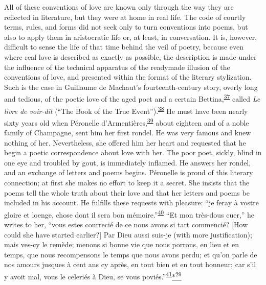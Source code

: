 All of these conventions of love are known only through the way they are
reflected in literature, but they were at home in real life. The code of
courtly terms, rules, and forms did not seek only to turn conventions
into poems, but also to apply them in aristocratic life or, at least, in
conversation. It is, however, difficult to sense the life of that time
behind the veil of poetry, because even where real love is described as
exactly as possible, the description is made under the influence of the
technical apparatus of the readymade illusion of the conventions of
love, and presented within the format of the literary stylization. Such
is the case in Guillaume de Machaut's fourteenth-century story, overly
long and tedious, of the poetic love of the aged poet and a certain
Bettina,\textsuperscript{\protect\hypertarget{11_Chapter_Four__THE_FORMS_OF_LOVE.xhtmlux5cux23id_1415}{\protect\hyperlink{23_NOTES.xhtmlux5cux23id_1416}{37}}}
called \emph{Le livre de voir-dit} (``The Book of the True
Event'').\textsuperscript{\protect\hypertarget{11_Chapter_Four__THE_FORMS_OF_LOVE.xhtmlux5cux23id_1413}{\protect\hyperlink{23_NOTES.xhtmlux5cux23id_1414}{38}}}
He must have been nearly sixty years old when Péronelle
d'Armentières,\textsuperscript{\protect\hypertarget{11_Chapter_Four__THE_FORMS_OF_LOVE.xhtmlux5cux23id_1411}{\protect\hyperlink{23_NOTES.xhtmlux5cux23id_1412}{39}}}
about eighteen and of a noble family of Champagne, sent him her first
\protect\hypertarget{11_Chapter_Four__THE_FORMS_OF_LOVE.xhtmlux5cux23page_145}{}{}rondel.
He was very famous and knew nothing of her. Nevertheless, she offered
him her heart and requested that he begin a poetic correspondence about
love with her. The poor poet, sickly, blind in one eye and troubled by
gout, is immediately inflamed. He answers her rondel, and an exchange of
letters and poems begins. Péronelle is proud of this literary
connection; at first she makes no effort to keep it a secret. She
insists that the poems tell the whole truth about their love and that
her letters and poems be included in his account. He fulfills these
requests with pleasure: ``je feray à vostre gloire et loenge, chose dont
il sera bon
mémoire.''\textsuperscript{\protect\hypertarget{11_Chapter_Four__THE_FORMS_OF_LOVE.xhtmlux5cux23id_1409}{\protect\hyperlink{23_NOTES.xhtmlux5cux23id_1410}{40}}}
``Et mon très-dous cuer,'' he writes to her, ``vous estes courrecié de
ce nous avons si tart commencié? {[}How could she have started
earlier?{]} Par Dieu aussi suis-je (with more justification); mais
ves-cy le remède; menons si bonne vie que nous porrons, en lieu et en
temps, que nous recompensons le temps que nous avons perdu; et qu'on
parle de nos amours jusques à cent ans cy après, en tout bien et en tout
honneur; car s'il y avoit mal, vous le celeriés à Dieu, se vous
poviés.''\textsuperscript{\protect\hypertarget{11_Chapter_Four__THE_FORMS_OF_LOVE.xhtmlux5cux23id_1407}{\protect\hyperlink{23_NOTES.xhtmlux5cux23id_1408}{41}}}\protect\hypertarget{11_Chapter_Four__THE_FORMS_OF_LOVE.xhtmlux5cux23id_2311}{\protect\hyperlink{23_NOTES.xhtmlux5cux23id_2312}{*\textsuperscript{29}}}

